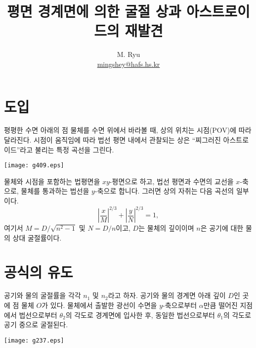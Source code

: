 \documentclass[twocolumn]{article}
\title{평면 경계면에 의한 굴절 상과 아스트로이드의 재발견}
\author{M. Ryu \\ {\href{mailto:mingshey@hafs.hs.kr}{mingshey@hafs.hs.kr}}}
\begin{document}
	\maketitle
	\section{도입}
	평평한 수면 아래의 점 물체를 수면 위에서 바라볼 때, 상의 위치는 시점(POV)에 따라 달라진다. 
	시점이 움직임에 따라 법선 평면 내에서 관찰되는 상은 ``찌그러진 아스트로이드''라고 불리는 특정 곡선을 그린다.
	
	\texttt{[image: g409.eps]}
	
	물체와 시점을 포함하는 법평면을 $xy$-평면으로 하고, 법선 평면과 수면의 교선을 $x$-축으로, 
	물체를 통과하는 법선을 $y$-축으로 합니다. 그러면 상의 자취는 다음 곡선의 일부이다.
	$$ \left| \dfrac{x}{M} \right| ^ {2/3} 
	+ \left| \dfrac{y}{N} \right| ^ {2/3} = 1,$$
	여기서 $M = D/\sqrt{n^2 - 1}$ 및 $N = D/n$이고, $D$는 물체의 깊이이며 $n$은 공기에 대한 물의 상대 굴절률이다.
	
	\section{공식의 유도}
	
	공기와 물의 굴절률을 각각 $n_1$ 및 $n_2$라고 하자. 공기와 물의 경계면 아래 깊이 $D$인 곳에 점 물체 $O$가 있다. 
	물체에서 출발한 광선이 수면을 $y$-축으로부터 $\alpha$만큼 떨어진 지점에서 
	법선으로부터 $\theta_2$의 각도로 경계면에 입사한 후, 동일한 법선으로부터 $\theta_1$의 각도로 공기 중으로 굴절된다.
	
	\texttt{[image: g237.eps]}
	
\end{document}
